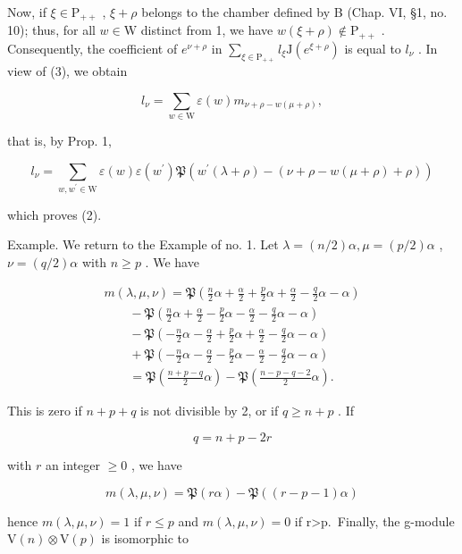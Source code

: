 Now, if \(\xi \in \mathrm{P}_{++}\) , \(\xi + \rho\) belongs to the chamber defined by B (Chap. VI, §1, no. 10); thus, for all \(w \in \mathrm{W}\) distinct from 1, we have \(w(\xi + \rho) \notin \mathrm{P}_{++}\) . Consequently, the coefficient of \(e^{\nu + \rho}\) in \(\sum_{\xi \in \mathrm{P}_{++}} l_{\xi} \mathrm{J}(e^{\xi + \rho})\) is equal to \(l_{\nu}\) . In view of (3), we obtain

\[
l _ {\nu} = \sum_ {w \in \mathrm{W}} \varepsilon (w) m _ {\nu + \rho - w (\mu + \rho)},
\]

that is, by Prop. 1,

\[
l _ {\nu} = \sum_ {w, w ^ {\prime} \in \mathrm{W}} \varepsilon (w) \varepsilon (w ^ {\prime}) \mathfrak {P} (w ^ {\prime} (\lambda + \rho) - (\nu + \rho - w (\mu + \rho) + \rho))
\]

which proves (2).

Example. We return to the Example of no. 1. Let \(\lambda = (n/2)\alpha, \mu = (p/2)\alpha\) , \(\nu = (q/2)\alpha\) with \(n \geq p\) . We have

\[
\begin{array}{l} m (\lambda , \mu , \nu) = \mathfrak {P} \left(\frac {n}{2} \alpha + \frac {\alpha}{2} + \frac {p}{2} \alpha + \frac {\alpha}{2} - \frac {q}{2} \alpha - \alpha\right) \\ \qquad - \mathfrak {P} \left(\frac {n}{2} \alpha + \frac {\alpha}{2} - \frac {p}{2} \alpha - \frac {\alpha}{2} - \frac {q}{2} \alpha - \alpha\right) \\ \qquad - \mathfrak {P} \left(- \frac {n}{2} \alpha - \frac {\alpha}{2} + \frac {p}{2} \alpha + \frac {\alpha}{2} - \frac {q}{2} \alpha - \alpha\right) \\ \qquad + \mathfrak {P} \left(- \frac {n}{2} \alpha - \frac {\alpha}{2} - \frac {p}{2} \alpha - \frac {\alpha}{2} - \frac {q}{2} \alpha - \alpha\right) \\ \qquad = \mathfrak {P} \left(\frac {n + p - q}{2} \alpha\right) - \mathfrak {P} \left(\frac {n - p - q - 2}{2} \alpha\right). \end{array}
\]

This is zero if \(n + p + q\) is not divisible by 2, or if \(q \geq n + p\) . If

\[
q = n + p - 2 r
\]

with \(r\) an integer \(\geq 0\) , we have

\[
m (\lambda , \mu , \nu) = \mathfrak {P} (r \alpha) - \mathfrak {P} ((r - p - 1) \alpha)
\]

hence \(m(\lambda,\mu,\nu)=1\) if \(r\leq p\) and \(m(\lambda,\mu,\nu)=0\) if r\textgreater p.~Finally, the g-module \(\mathrm{V}(n)\otimes\mathrm{V}(p)\) is isomorphic to

